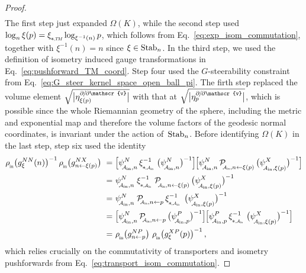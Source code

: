 \begin{proof}
\begin{align}
    \end{align}
    The first step just expanded $\Omega(K)$, while the second step used $\log_n\xi(p) = \dxiTM \log_{\xi^{-1}(n)} p$, which follows from Eq.~\eqref{eq:exp_isom_commutation}, together with $\xi^{-1}(n) = n$ since $\xi\in\operatorname{Stab}_{n}$.
    In the third step, we used the definition of isometry induced gauge transformations in Eq.~\eqref{eq:pushforward_TM_coord}.
    Step four used the $G$-steerability constraint from Eq.~\eqref{eq:G_steer_kernel_space_open_ball_pi}.
    The firth step replaced the volume element 
    $\sqrt{\big|\eta_{\xi(p)}^{\partial\mkern-2mu/\mkern-2mu\partial\mathscr{v}}\big|}$
    with that at
    $\sqrt{\big|\eta_p^{\partial\mkern-2mu/\mkern-2mu\partial\mathscr{v}}\big|}$,
    which is possible since the whole Riemannian geometry of the sphere, including the metric and exponential map and therefore the volume factors of the geodesic normal coordinates, is invariant under the action of~$\operatorname{Stab}_{n}$.
    Before identifying $\Omega(K)$ in the last step, step six used the identity
    \begin{align}
        \rhoin\big( g_\xi^{NN}(n) \big)^{-1}\, \rhoin\big( g_{n\leftarrow\xi(p)}^{NX} \big)
        \ =&\ \pig[ \psiAinn^N\, \dxiAin^{-1}\, \big(\psiAinn^N \big)^{-1} \pig] \pig[ \psiAinn^N\, \PAinnxip\, \big(\psiAinxip^X \big)^{-1} \pig] \notag \\
        \ =&\ \psiAinn^N\; \dxiAin^{-1}\, \PAinnxip\, \big(\psiAinxip^X \big)^{-1} \notag \\
        \ =&\ \psiAinn^N\; \PAinnp\, \dxiAin^{-1}\ \big(\psiAinxip^X \big)^{-1} \notag \\
        \ =&\ \pig[ \psiAinn^N\, \PAinnp\, \big(\psiAinp^P \big)^{-1} \pig] \pig[ \psiAinp^P\, \dxiAin^{-1}\, \big(\psiAinxip^X \big)^{-1} \pig] \notag \\
        \ =&\ \rhoin\big( g_{n\leftarrow p}^{NP} \big)\ \rhoin\big( g_\xi^{XP}(p) \big)^{-1} \,,
    \end{align}
    which relies crucially on the commutativity of transporters and isometry pushforwards from Eq.~\eqref{eq:transport_isom_commutation}.



\end{proof}
